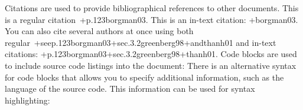{}Citations are used to provide bibliographical references to other documents. This is a regular citation~+{}{p.\markdownRendererNbsp{}123}{borgman03}. This is an in-text citation: +{}{}{borgman03}. You can also cite several authors at once using both regular~+{see}{p.\markdownRendererNbsp{}123}{borgman03}+{}{sec.\markdownRendererNbsp{}3.2}{greenberg98}+{and}{}{thanh01} and in-text citations: +{}{p.123}{borgman03}+{}{sec.\markdownRendererNbsp{}3.2}{greenberg98}+{}{}{thanh01}.\markdownRendererInterblockSeparator
{}Code blocks are used to include source code listings into the document:\markdownRendererInterblockSeparator
{}\markdownRendererInterblockSeparator
{}There is an alternative syntax for code blocks that allows you to specify additional information, such as the language of the source code. This information can be used for syntax highlighting:\markdownRendererInterblockSeparator
{}\markdownRendererInterblockSeparator
{}\relax